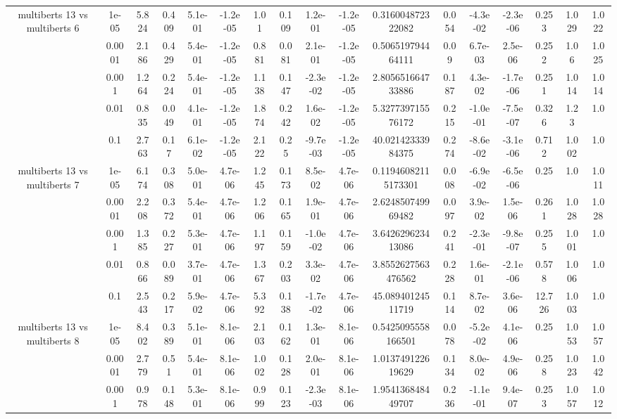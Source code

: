 \begin{tabular}{|c|c|c|c|c|c|c|c|c|c|c|c|c|c|c|c|c|}
\hline
\multirow{5}{*}{multiberts 13 vs multiberts 6} & 1e-05 & 5.824 & 0.409 & 5.1e-01 & -1.2e-05 & 1.01 & 0.109 & 1.2e-01 & -1.2e-05 & 0.316004872322082 & 0.054 & -4.3e-02 & -2.3e-06 & 0.253 & 1.029 & 1.022 \\
 & 0.0001 & 2.186 & 0.429 & 5.4e-01 & -1.2e-05 & 0.881 & 0.081 & 2.1e-01 & -1.2e-05 & 0.506519794464111 & 0.09 & 6.7e-03 & 2.5e-06 & 0.252 & 1.06 & 1.025 \\
 & 0.001 & 1.264 & 0.224 & 5.4e-01 & -1.2e-05 & 1.138 & 0.147 & -2.3e-02 & -1.2e-05 & 2.805651664733886 & 0.187 & 4.3e-02 & -1.7e-06 & 0.251 & 1.014 & 1.014 \\
 & 0.01 & 0.835 & 0.049 & 4.1e-01 & -1.2e-05 & 1.874 & 0.242 & 1.6e-02 & -1.2e-05 & 5.327739715576172 & 0.215 & -1.0e-01 & -7.5e-07 & 0.326 & 1.23 & 1.0 \\
 & 0.1 & 2.763 & 0.17 & 6.1e-02 & -1.2e-05 & 2.122 & 0.25 & -9.7e-03 & -1.2e-05 & 40.02142333984375 & 0.274 & -8.6e-02 & -3.1e-06 & 0.712 & 1.002 & 1.0 \\
\hline
\multirow{5}{*}{multiberts 13 vs multiberts 7} & 1e-05 & 6.174 & 0.308 & 5.0e-01 & 4.7e-06 & 1.245 & 0.173 & 8.5e-02 & 4.7e-06 & 0.11946082115173301 & 0.008 & -6.9e-02 & -6.5e-06 & 0.25 & 1.0 & 1.011 \\
 & 0.0001 & 2.208 & 0.372 & 5.4e-01 & 4.7e-06 & 1.206 & 0.165 & 1.9e-01 & 4.7e-06 & 2.624850749969482 & 0.097 & 3.9e-02 & 1.5e-06 & 0.261 & 1.028 & 1.028 \\
 & 0.001 & 1.385 & 0.227 & 5.3e-01 & 4.7e-06 & 1.197 & 0.159 & -1.0e-02 & 4.7e-06 & 3.642629623413086 & 0.241 & -2.3e-01 & -9.8e-07 & 0.255 & 1.001 & 1.0 \\
 & 0.01 & 0.866 & 0.089 & 3.7e-01 & 4.7e-06 & 1.367 & 0.203 & 3.3e-02 & 4.7e-06 & 3.8552627563476562 & 0.228 & 1.6e-01 & -2.1e-06 & 0.578 & 1.006 & 1.0 \\
 & 0.1 & 2.543 & 0.217 & 5.9e-02 & 4.7e-06 & 5.392 & 0.138 & -1.7e-02 & 4.7e-06 & 45.08940124511719 & 0.114 & 8.7e-02 & 3.6e-06 & 12.726 & 1.003 & 1.0 \\
\hline
\multirow{5}{*}{multiberts 13 vs multiberts 8} & 1e-05 & 8.402 & 0.389 & 5.1e-01 & 8.1e-06 & 2.103 & 0.162 & 1.3e-01 & 8.1e-06 & 0.5425095558166501 & 0.078 & -5.2e-02 & 4.1e-06 & 0.25 & 1.053 & 1.057 \\
 & 0.0001 & 2.779 & 0.51 & 5.4e-01 & 8.1e-06 & 1.002 & 0.128 & 2.0e-01 & 8.1e-06 & 1.013749122619629 & 0.134 & 8.0e-02 & 4.9e-06 & 0.258 & 1.023 & 1.042 \\
 & 0.001 & 0.978 & 0.148 & 5.3e-01 & 8.1e-06 & 0.999 & 0.123 & -2.3e-03 & 8.1e-06 & 1.954136848449707 & 0.236 & -1.1e-01 & 9.4e-07 & 0.253 & 1.057 & 1.012 \\

\end{tabular}
